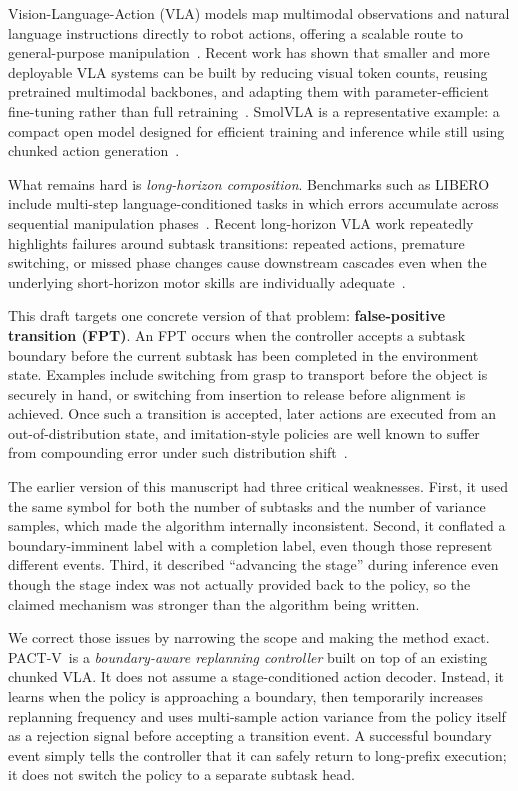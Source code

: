 \documentclass[10pt]{article}
\newcommand{\method}{\textsc{PACT-V}\xspace}
\begin{document}
Vision-Language-Action (VLA) models map multimodal observations and natural
language instructions directly to robot actions, offering a scalable route to
general-purpose manipulation~\cite{openvla,rt2,msplora}.
Recent work has shown that smaller and more deployable VLA systems can be built
by reducing visual token counts, reusing pretrained multimodal backbones, and
adapting them with parameter-efficient fine-tuning rather than full retraining~\cite{openvla,msplora}.
SmolVLA is a representative example: a compact open model designed for efficient
training and inference while still using chunked action generation~\cite{msplora}.

What remains hard is \emph{long-horizon composition}.
Benchmarks such as LIBERO include multi-step language-conditioned tasks in which
errors accumulate across sequential manipulation phases~\cite{libero}.
Recent long-horizon VLA work repeatedly highlights failures around subtask
transitions: repeated actions, premature switching, or missed phase changes
cause downstream cascades even when the underlying short-horizon motor skills
are individually adequate~\cite{palm,cyclevla}.

This draft targets one concrete version of that problem:
\textbf{false-positive transition (FPT)}.
An FPT occurs when the controller accepts a subtask boundary before the current
subtask has been completed in the environment state.
Examples include switching from grasp to transport before the object is securely
in hand, or switching from insertion to release before alignment is achieved.
Once such a transition is accepted, later actions are executed from an
out-of-distribution state, and imitation-style policies are well known to suffer
from compounding error under such distribution shift~\cite{ross2011dagger}.

The earlier version of this manuscript had three critical weaknesses.
First, it used the same symbol for both the number of subtasks and the number of
variance samples, which made the algorithm internally inconsistent.
Second, it conflated a boundary-imminent label with a completion label, even
though those represent different events.
Third, it described ``advancing the stage'' during inference even though the
stage index was not actually provided back to the policy, so the claimed
mechanism was stronger than the algorithm being written.

We correct those issues by narrowing the scope and making the method exact.
\method\ is a \emph{boundary-aware replanning controller} built on top of an
existing chunked VLA.
It does not assume a stage-conditioned action decoder.
Instead, it learns when the policy is approaching a boundary, then temporarily
increases replanning frequency and uses multi-sample action variance from the
policy itself as a rejection signal before accepting a transition event.
A successful boundary event simply tells the controller that it can safely
return to long-prefix execution; it does not switch the policy to a separate
subtask head.
\end{document}
